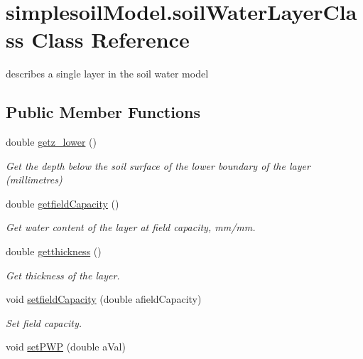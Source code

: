 \hypertarget{classsimplesoil_model_1_1soil_water_layer_class}{}\section{simplesoil\+Model.\+soil\+Water\+Layer\+Class Class Reference}
\label{classsimplesoil_model_1_1soil_water_layer_class}


describes a single layer in the soil water model  


\subsection*{Public Member Functions}
\begin{DoxyCompactItemize}
\item 
double \mbox{\hyperlink{classsimplesoil_model_1_1soil_water_layer_class_a19bf8dada96698408785d7107cd3e727}{getz\+\_\+lower}} ()
\begin{DoxyCompactList}\small\item\em Get the depth below the soil surface of the lower boundary of the layer (millimetres) \end{DoxyCompactList}\item 
double \mbox{\hyperlink{classsimplesoil_model_1_1soil_water_layer_class_a6edc46e4aa1dd094ddb1af43bcae66c7}{getfield\+Capacity}} ()
\begin{DoxyCompactList}\small\item\em Get water content of the layer at field capacity, mm/mm. \end{DoxyCompactList}\item 
double \mbox{\hyperlink{classsimplesoil_model_1_1soil_water_layer_class_a98ded129a2dd2c7acabdecced57b9c6e}{getthickness}} ()
\begin{DoxyCompactList}\small\item\em Get thickness of the layer. \end{DoxyCompactList}\item 
void \mbox{\hyperlink{classsimplesoil_model_1_1soil_water_layer_class_a0cdc93a7b1301061b3e542cde9f81405}{setfield\+Capacity}} (double afield\+Capacity)
\begin{DoxyCompactList}\small\item\em Set field capacity. \end{DoxyCompactList}\item 
void \mbox{\hyperlink{classsimplesoil_model_1_1soil_water_layer_class_af8198e7750a10d82d6d443b0e937aff7}{set\+P\+WP}} (double a\+Val)

\end{DoxyCompactItemize}

